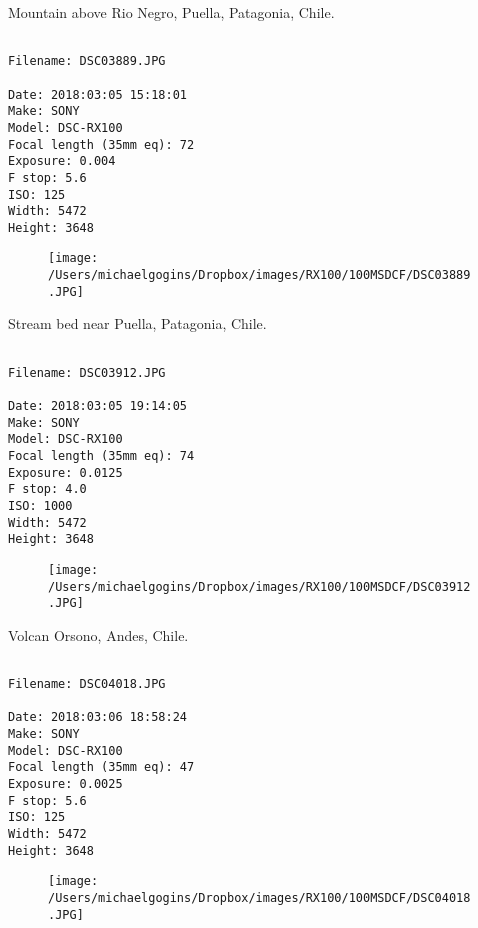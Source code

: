 \documentclass[11pt,letter,DIV=14,paper=landscape]{scrbook}
\begin{document}
\clearpage
\noindent Mountain above Rio Negro, Puella, Patagonia, Chile.
\noindent
\begin{lstlisting}

Filename: DSC03889.JPG

Date: 2018:03:05 15:18:01
Make: SONY
Model: DSC-RX100
Focal length (35mm eq): 72
Exposure: 0.004
F stop: 5.6
ISO: 125
Width: 5472
Height: 3648
\end{lstlisting}
\clearpage

\begin{figure}
\texttt{[image: /Users/michaelgogins/Dropbox/images/RX100/100MSDCF/DSC03889.JPG]}
\end{figure}
    
\clearpage
\noindent Stream bed near Puella, Patagonia, Chile.
\noindent
\begin{lstlisting}

Filename: DSC03912.JPG

Date: 2018:03:05 19:14:05
Make: SONY
Model: DSC-RX100
Focal length (35mm eq): 74
Exposure: 0.0125
F stop: 4.0
ISO: 1000
Width: 5472
Height: 3648
\end{lstlisting}
\clearpage

\begin{figure}
\texttt{[image: /Users/michaelgogins/Dropbox/images/RX100/100MSDCF/DSC03912.JPG]}
\end{figure}
    
\clearpage
\noindent Volcan Orsono, Andes, Chile.
\noindent
\begin{lstlisting}

Filename: DSC04018.JPG

Date: 2018:03:06 18:58:24
Make: SONY
Model: DSC-RX100
Focal length (35mm eq): 47
Exposure: 0.0025
F stop: 5.6
ISO: 125
Width: 5472
Height: 3648
\end{lstlisting}
\clearpage

\begin{figure}
\texttt{[image: /Users/michaelgogins/Dropbox/images/RX100/100MSDCF/DSC04018.JPG]}
\end{figure}
    
\end{document}
